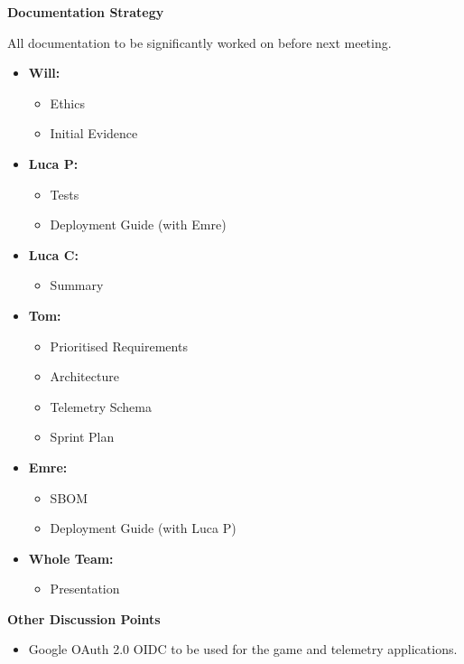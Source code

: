 \documentclass[11pt]{article}
\begin{document}
    \textbf{Documentation Strategy}
    \item All documentation to be significantly worked on before next meeting.
    \begin{itemize}
        \item \textbf{Will:}
        \begin{itemize}
            \item Ethics
            \item Initial Evidence
        \end{itemize}

        \item \textbf{Luca P:}
        \begin{itemize}
            \item Tests
            \item Deployment Guide (with Emre)
        \end{itemize}

        \item \textbf{Luca C:}
        \begin{itemize}
            \item Summary
        \end{itemize}

        \item \textbf{Tom:}
        \begin{itemize}
            \item Prioritised Requirements
            \item Architecture
            \item Telemetry Schema
            \item Sprint Plan
        \end{itemize}

        \item \textbf{Emre:}
        \begin{itemize}
            \item SBOM
            \item Deployment Guide (with Luca P)
        \end{itemize}

        \item \textbf{Whole Team:}
        \begin{itemize}
            \item Presentation
        \end{itemize}
    \end{itemize}

    \textbf{Other Discussion Points}
    \begin{itemize}
        \item Google OAuth 2.0 OIDC to be used for the game and telemetry applications.
    \end{itemize}
\end{document}
